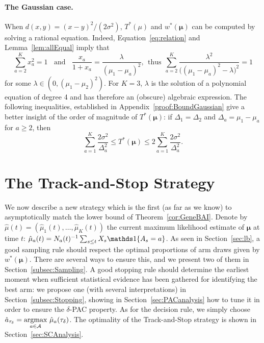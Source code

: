 \documentclass{colt2016} %
\begin{document}
\paragraph{The Gaussian case.}
When $d(x,y) = (x-y)^2/(2\sigma^2)$, $T^*(\mu)$ and $w^*(\bm \mu)$ can be computed by solving a rational equation. Indeed, Equation~\eqref{eq:relation} and Lemma~\ref{lem:allEqual} imply that 
\[\sum_{a=2}^K x_a^2 = 1 \ \ \ \ \text{and} \ \ \ \ \frac{x_a}{1+x_a} = \frac{\lambda}{(\mu_1-\mu_a)^2}, \ \ \text{thus} \ \ \sum_{a=2}^K\frac{\lambda^2}{\big((\mu_1-\mu_a)^2 - \lambda\big)^2} = 1\]
for some $\lambda \in (0, (\mu_1-\mu_2)^2)$. For $K=3$, $\lambda$ is the solution of a polynomial equation of degree 4 
and has therefore an (obscure) algebraic expression. 
The following inequalities, established in Appendix~\ref{proof:BoundGaussian} give a better insight of the order of magnitude of $T^*(\bm \mu)$: if $\Delta_1 = \Delta_2$ and $\Delta_a = \mu_1 - \mu_a$ for $a\geq 2$, then
\[\sum_{a=1}^K \frac{2\sigma^2}{\Delta_a^2} \leq T^*(\bm \mu) \leq 2 \sum_{a=1}^K \frac{2\sigma^2}{\Delta_a^2}.\]


\section{The Track-and-Stop Strategy}\label{sec:algo}
We now describe a new strategy which is the first (as far as we know) to asymptotically match the lower bound of Theorem~\ref{cor:GeneBAI}.
Denote by $\hat{\mu}(t) = (\hat{\mu}_1(t), \dots, \hat{\mu}_K(t))$ the current maximum likelihood estimate of $\bm\mu$ at time $t$: $\hat{\mu}_a(t)=N_a(t)^{-1}\sum_{s\leq t}X_s \ind\{A_s=a\}$.
As seen in Section~\ref{sec:lb}, a good sampling rule should respect the optimal proportions of arm draws given by $w^*(\bm \mu)$. There are several ways to ensure this, and we present two of them in Section~\ref{subsec:Sampling}.
A good stopping rule should determine the earliest moment when sufficient statistical evidence has been gathered for identifying the best arm: we propose one (with several interpretations) in Section~\ref{subsec:Stopping}, showing in Section~\ref{sec:PACanalysis} how to tune it in order to ensure the $\delta$-PAC property.
As for the decision rule, we simply choose $\hat{a}_{\tau_\delta} = \argmax{a\in\Arms} \ \hat{\mu}_a(\tau_\delta)$.
The optimality of the Track-and-Stop strategy is shown in Section~\ref{sec:SCAnalysis}.
\end{document}
